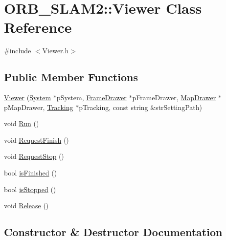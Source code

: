 \hypertarget{class_o_r_b___s_l_a_m2_1_1_viewer}{}\section{O\+R\+B\+\_\+\+S\+L\+A\+M2\+:\+:Viewer Class Reference}
\label{class_o_r_b___s_l_a_m2_1_1_viewer}


{\ttfamily \#include $<$Viewer.\+h$>$}

\subsection*{Public Member Functions}
\begin{DoxyCompactItemize}
\item 
\mbox{\hyperlink{class_o_r_b___s_l_a_m2_1_1_viewer_abe1f6eab6a1976e589f37a14b80c448b}{Viewer}} (\mbox{\hyperlink{class_o_r_b___s_l_a_m2_1_1_system}{System}} $\ast$p\+System, \mbox{\hyperlink{class_o_r_b___s_l_a_m2_1_1_frame_drawer}{Frame\+Drawer}} $\ast$p\+Frame\+Drawer, \mbox{\hyperlink{class_o_r_b___s_l_a_m2_1_1_map_drawer}{Map\+Drawer}} $\ast$p\+Map\+Drawer, \mbox{\hyperlink{class_o_r_b___s_l_a_m2_1_1_tracking}{Tracking}} $\ast$p\+Tracking, const string \&str\+Setting\+Path)
\item 
void \mbox{\hyperlink{class_o_r_b___s_l_a_m2_1_1_viewer_a68c269890714298034997be622f09947}{Run}} ()
\item 
void \mbox{\hyperlink{class_o_r_b___s_l_a_m2_1_1_viewer_af9079c4e563099cf3c8cda403c854cf8}{Request\+Finish}} ()
\item 
void \mbox{\hyperlink{class_o_r_b___s_l_a_m2_1_1_viewer_a4b23bbdcc2c5898d074870785a3e07c5}{Request\+Stop}} ()
\item 
bool \mbox{\hyperlink{class_o_r_b___s_l_a_m2_1_1_viewer_a51c55a1f1ad05a6ba2c6b57f9133f88d}{is\+Finished}} ()
\item 
bool \mbox{\hyperlink{class_o_r_b___s_l_a_m2_1_1_viewer_aa1888ef340152348f395a814ddfb362f}{is\+Stopped}} ()
\item 
void \mbox{\hyperlink{class_o_r_b___s_l_a_m2_1_1_viewer_a2b0eeffd84b5d94a4c4f4e0db174c9fe}{Release}} ()
\end{DoxyCompactItemize}


\subsection{Constructor \& Destructor Documentation}
\mbox{\label{class_o_r_b___s_l_a_m2_1_1_viewer_abe1f6eab6a1976e589f37a14b80c448b}} 
